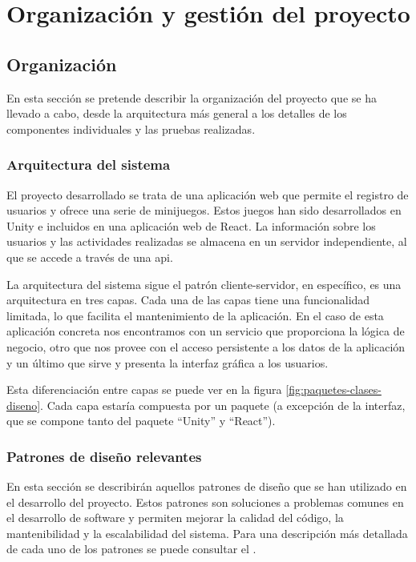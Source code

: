 \chapter{Organización y gestión del proyecto}
\label{cap:organizacion}
\section{Organización}
\label{sec:organizacion}
En esta sección se pretende describir la organización del proyecto que se ha llevado a cabo, desde
la arquitectura más general a los detalles de los componentes individuales y las pruebas
realizadas.

\subsection{Arquitectura del sistema}
El proyecto desarrollado se trata de una aplicación web que permite el registro de usuarios
y ofrece una serie de minijuegos. Estos juegos han sido desarrollados en Unity e
incluidos en una aplicación web de React. La información sobre los usuarios y las
actividades realizadas se almacena en un servidor independiente, al que se accede a través de
una \gls{api}.

La arquitectura del sistema sigue el patrón cliente-servidor, en específico, es una arquitectura
en tres capas. Cada una de las capas tiene una funcionalidad limitada, lo que facilita el
mantenimiento de la aplicación. En el caso de esta aplicación concreta nos encontramos con un
servicio que proporciona la lógica de negocio, otro que nos provee con el acceso persistente
a los datos de la aplicación y un último que sirve y presenta la interfaz gráfica a los usuarios.

Esta diferenciación entre capas se puede ver en la figura \ref{fig:paquetes-clases-diseno}. Cada
capa estaría compuesta por un paquete (a excepción de la interfaz, que se compone tanto del
paquete \enquote{Unity} y \enquote{React}).


\subsection{Patrones de diseño relevantes}
En esta sección se describirán aquellos patrones de diseño que se han utilizado en el
desarrollo del proyecto. Estos patrones son soluciones a problemas comunes en el desarrollo de
software y permiten mejorar la calidad del código, la mantenibilidad y la escalabilidad del
sistema. Para una descripción más detallada de cada uno de los patrones se puede consultar
el \segundoAnexo.

